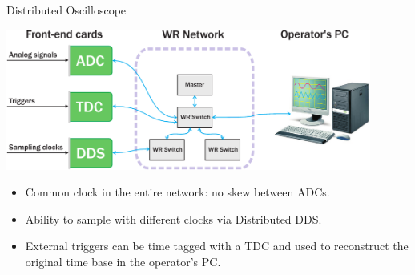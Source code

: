 \documentclass[compress,red]{beamer}
\begin{document}
\begin{frame}{Distributed Oscilloscope}
  \begin{center}
    \includegraphics[width=0.9\textwidth]{applications/distr_oscill.pdf}
    \end{center}
    \begin{block}{}
      \begin{itemize}
      \item Common clock in the entire network: no skew between ADCs.
      \item Ability to sample with different clocks via Distributed DDS.
      \item External triggers can be time tagged with a TDC and used to reconstruct the original time base in the operator's PC.
      \end{itemize}
    \end{block}
\end{frame}
\end{document}

